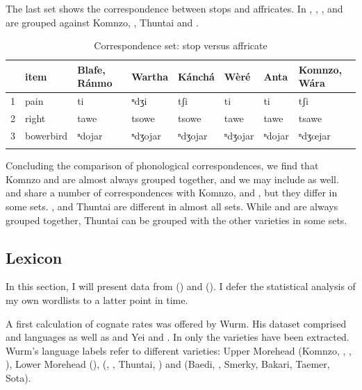\FloatBarrier
The last set shows the correspondence between stops and affricates. In , , ,  and  are grouped against Komnzo, ,  Thuntai and .

\begin{table}
\caption{Correspondence set: stop versus affricate}
\label{affrstop}
	\begin{tabularx}{\textwidth}{llXXXXXX}
		\lsptoprule
			&{item} &Blafe, Ránmo &Wartha &Kánchá &Wèré &Anta &Komnzo, Wára\\\midrule
			1 &{pain} &ti &ⁿdʒi &tʃi &ti &ti &tʃi\\
			2 &{right} &tawe &tsowe &tsowe &tawe &tawe &tsawe\\
			3 &{bowerbird} &ⁿdojar &ⁿdʒojar &ⁿdʒojar &ⁿdʒojar &ⁿdojar &ⁿdʒœjar\\
		\lspbottomrule
	\end{tabularx}
\end{table}%

Concluding the comparison of phonological correspondences, we find that Komnzo and  are almost always grouped together, and we may include  as well.  and  share a number of correspondences with Komnzo,  and , but they differ in some sets. ,  and  Thuntai are different in almost all sets. While  and  are always grouped together,  Thuntai can be grouped with the other varieties in some sets.

\subsection{Lexicon}\label{comp-lex}

In this section, I will present data from (\citealt{Wurm:1971uw}) and (\citealt{Clifton:1991fly}). I defer the statistical analysis of my own wordlists to a latter point in time.

A first calculation of cognate rates was offered by Wurm. His dataset comprised  and  languages as well as and Yei and . In  only the  varieties have been extracted. Wurm's language labels refer to different  varieties: Upper Morehead (Komnzo, , , ), Lower Morehead (),  (, ,  Thuntai, ) and  (Baedi, , Smerky, Bakari, Taemer, Sota).


